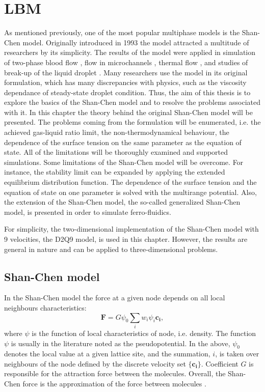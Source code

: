 \documentclass[mathpazo]{cicp}
\begin{document}
\section{LBM}
\label{sec:lbm:binary:liquids}
As mentioned previously, one of the most popular multiphase models is the Shan-Chen model. Originally introduced in 1993 \cite{Shan-chen:extended} the model attracted a multitude of researchers by its simplicity. The results of the model were applied in simulation of two-phase blood flow \cite{halliday-multicomponent}, flow in microchannels \cite{fan-multi}, thermal flow \cite{zhang-thermal}, and studies of break-up of the liquid droplet \cite{nourgaliev-breakup}. Many researchers use the model in its original formulation, which has many discrepancies with physics, such as the viscosity dependance of steady-state droplet condition. Thus, the aim of this thesis is to explore the basics of the Shan-Chen model and to resolve the problems associated with it. In this chapter the theory behind the original Shan-Chen model will be presented. The problems coming from the formulation will be enumerated, i.e. the achieved gas-liquid ratio limit, the non-thermodynamical behaviour, the dependence of the surface tension on the same parameter as the equation of state. All of the limitations will be thoroughly examined and supported simulations. Some limitations of the Shan-Chen model will be overcome. For instance, the stability limit can be expanded by applying the extended equilibrium distribution function. The dependence of the surface tension and the equation of state on one parameter is solved with the multirange potential. Also, the extension of the Shan-Chen model, the so-called generalized Shan-Chen model, is presented in order to simulate ferro-fluidics. 

For simplicity, the two-dimensional implementation of the Shan-Chen model with 9 velocities, the D2Q9 model, is used in this chapter. However, the results are general in nature and can be applied to three-dimensional problems.

\subsection{Shan-Chen model}

In the Shan-Chen model \cite{Shan-chen:extended} the force at a given node depends on all local neighbours characteristics:
\begin{equation}  \label{Shan-Chen:Shan-Chen:cont}
\bm{F}=G\psi_{0}\sum_{i}{w_i \psi_{i}\bm{c_{i}}},
\end{equation}
where $\psi$ is the function of local characteristics of node, i.e. density. The function $\psi$ is usually in the literature noted as the pseudopotential. In the above, $\psi_0$ denotes the local value at a given lattice site, and the summation, $i$, is taken over
neighbours of the node defined by the discrete velocity set $\{\bm{c_i}\}$. Coefficient $G$ is responsible for the attraction force between the molecules. Overall, the Shan-Chen force is the approximation of the force between molecules \cite{kwok,kwok-contact-angle}.
\end{document}
